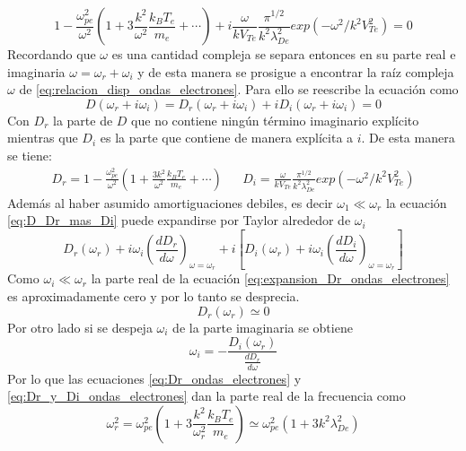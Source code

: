 \documentclass[../tesis_main_file.tex]{subfile}
\begin{document}
\begin{equation}
\label{eq:relacion_disp_ondas_electrones}
1- \frac{\omega^2_{pe}}{\omega^2}\left(1+3\frac{k^2}{\omega^2}\frac{k_BT_{e}}{m_{e}}+\cdots \right)+i\frac{\omega}{kV_{Te}}\frac{\pi^{1/2}}{k^2\lambda^2_{De}}exp(-\omega^2/k^2V^2_{Te}) =0
\end{equation}
Recordando que $\omega$ es una cantidad compleja se separa entonces en su parte real e imaginaria $\omega =\omega_r +\omega_i$ y de esta manera se prosigue a encontrar la raíz compleja $\omega$ de \ref{eq:relacion_disp_ondas_electrones}.
Para ello se reescribe la ecuación como
\begin{equation}
\label{eq:D_Dr_mas_Di}
D(\omega_r + i\omega_i) = D_r(\omega_r + i\omega_i)+iD_i(\omega_r + i\omega_i)=0
\end{equation}
Con $D_r$ la parte de $D$ que no contiene ningún término imaginario explícito mientras que $D_i$ es la parte que contiene de manera explícita a $i$. De esta manera se tiene:
\begin{align}
\label{eq:Dr_y_Di_ondas_electrones}
D_r =1-\frac{\omega^2_{pe}}{\omega^2}\left(1+\frac{3k^2}{\omega^2}\frac{k_BT_e}{m_e}+\cdots\right)&&D_i=\frac{\omega}{kV_{Te}}\frac{\pi^{1/2}}{k^2\lambda^2_{De}}exp(-\omega^2/k^2V^2_{Te})
\end{align}
Además al haber asumido amortiguaciones debiles, es decir $\omega_1 \ll \omega_r$ la ecuación \ref{eq:D_Dr_mas_Di} puede expandirse por Taylor alrededor de $\omega_i$
\begin{equation}
\label{eq:expansion_Dr_ondas_electrones}
D_r(\omega_r)+i\omega_i \left(\frac{dD_r}{d\omega}\right)_{\omega=\omega_r} + i\left[D_i(\omega_r)+i\omega_i\left(\frac{dD_i}{d\omega}\right)_{\omega=\omega_r}\right]
\end{equation}
Como $\omega_i \ll \omega_r$ la parte real de la ecuación \ref{eq:expansion_Dr_ondas_electrones} es aproximadamente cero y por lo tanto se desprecia.
\begin{equation}
\label{eq:Dr_ondas_electrones}
D_r(\omega_r)\simeq 0
\end{equation}
Por otro lado si se despeja $\omega_i$ de la parte imaginaria se obtiene
\begin{equation}
\label{eq:despeje_parte_im_ondas_electrones}
\omega_i=-\frac{D_i(\omega_r)}{\frac{dD_r}{d\omega}}
\end{equation}
Por lo que las ecuaciones \ref{eq:Dr_ondas_electrones} y \ref{eq:Dr_y_Di_ondas_electrones} dan la parte real de la frecuencia como
\begin{equation}
\label{eq:wr_ondas_electrones}
\omega^2_r=\omega^2_{pe}\left(1+3\frac{k^2}{\omega^2_r}\frac{k_BT_e}{m_e}\right)\simeq\omega^2_{pe}\left(1+3k^2\lambda^2_{De}\right)
\end{equation}
\end{document}
